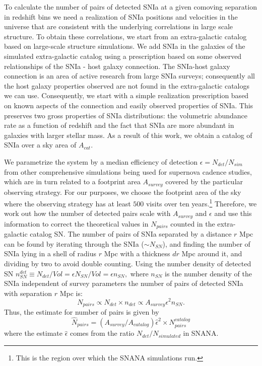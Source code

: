 \documentclass[a4paper,10pt]{article}
\begin{document}
To calculate the number of pairs of detected SNIa at a given comoving separation in redshift bins we need a realization of SNIa positions and velocities in the universe that are consistent with the underlying correlations in large scale structure. To obtain these correlations, we start from an extra-galactic catalog based on large-scale structure simulations. We add SNIa in the galaxies of the simulated extra-galactic catalog using a prescription based on some observed relationships of the SNIa - host galaxy connection. The SNIa-host galaxy connection is an area of active research from large SNIa surveys; consequently all the host galaxy properties observed are not found in the extra-galactic catalogs we can use. Consequently, we start with a simple realization prescription based on known aspects of the connection and easily observed properties of SNIa. This preserves two gross properties of SNIa distributions: the volumetric abundance rate as a function of redshift and the fact that SNIa are more abundant in galaxies with larger stellar mass. As a result of this work, we obtain a catalog of SNIa over a sky area of $A_{cat}.$

We parametrize the system by a median efficiency of detection $\epsilon = N_{det}/N_{sim}$ from other comprehensive simulations being used for supernova cadence studies, which are in turn related to a footprint area $A_{survey}$ covered by the particular observing strategy. For our purposes, we choose the footprint area of the sky where the observing strategy has at least $500$ visits over ten years.\footnote{This is the region over which the SNANA simulations run.}
Therefore, we work out how the number of detected pairs scale with $A_{survey}$ and $\epsilon$ and use this information to correct the theoretical values in $N_{pairs}$ counted in the extra-galactic catalog SN. The number of pairs of SNIa separated by a distance $r$ Mpc can be found by iterating through the SNIa ($\sim N_{SN}$), and finding the number of SNIa lying in a shell of radius $r$ Mpc with a thickness $dr$ Mpc around it, and dividing by two to avoid double counting. Using the number density of detected SN $n^{det}_{SN} \equiv N_{det}/Vol = \epsilon N_{SN}/Vol = \epsilon n_{SN},$ where $n_{SN}$ is the number density of the SNIa independent of survey parameters the number of pairs of detected SNIa with separation $r$ Mpc is:
    $$
    N_{pairs} \propto N_{det} \times {n_{det}} \propto A_{survey} \epsilon^2 {n_{SN}}.
    $$
Thus, the estimate for number of pairs is given by
$$
    \hat{N}_{pairs} = \left( A_{survey} / A_{catalog} \right)\hat{\epsilon}^2 \times N_{pairs}^{catalog}
    $$
where the estimate $\hat{\epsilon}$ comes from the ratio $N_{det}/ N_{simulated}$ in SNANA. 
\end{document}
